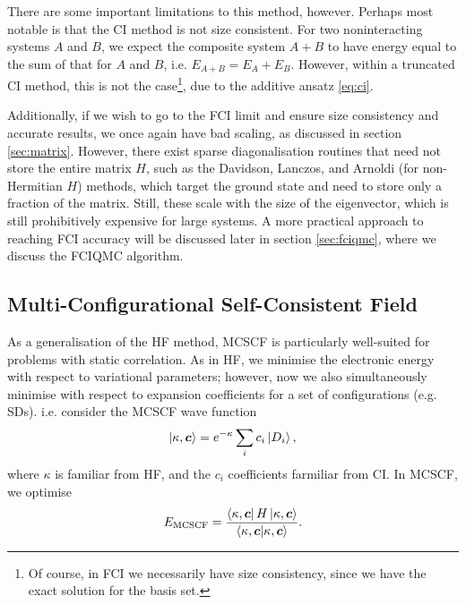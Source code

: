 There are some important limitations to this method, however. Perhaps most notable is that the \gls{CI} method is not size consistent. For two noninteracting systems $A$ and $B$, we expect the composite system $A+B$ to have energy equal to the sum of that for $A$ and $B$, i.e. $E_{A+B}=E_A+E_B$. However, within a truncated \gls{CI} method, this is not the case\footnote{Of course, in \gls{FCI} we necessarily have size consistency, since we have the exact solution for the basis set.}, due to the additive ansatz \ref{eq:ci}.

Additionally, if we wish to go to the \gls{FCI} limit and ensure size consistency and accurate results, we once again have bad scaling, as discussed in section \ref{sec:matrix}. However, there exist sparse diagonalisation routines that need not store the entire matrix $H$, such as the Davidson,\cite{davidsonIterative1975} Lanczos,\cite{lanczosIteration1950} and Arnoldi\cite{arnoldiPrinciple1951} (for non-Hermitian $H$) methods, which target the ground state and need to store only a fraction of the matrix. Still, these scale with the size of the eigenvector, which is still prohibitively expensive for large systems. A more practical approach to reaching \gls{FCI} accuracy will be discussed later in section \ref{sec:fciqmc}, where we discuss the \gls{FCIQMC} algorithm.

\subsection{Multi-Configurational Self-Consistent Field}

As a generalisation of the \gls{HF} method, \gls{MCSCF} is particularly well-suited for problems with static correlation.\cite{helgakerMolecular2014,eadeDirect1981,roosNew1972} As in \gls{HF}, we minimise the electronic energy with respect to variational parameters; however, now we also simultaneously minimise with respect to expansion coefficients for a set of configurations (e.g. \glspl{SD}). i.e. consider the MCSCF wave function
\begin{equation}
\ket{\kappa,\bm c} = e^{-\kappa}\sum_ic_i\ket{D_i},
\end{equation}
where $\kappa$ is familiar from HF, and the $c_i$ coefficients farmiliar from \gls{CI}. In MCSCF, we optimise
\begin{equation}
E_\mathrm{MCSCF} = \frac{\bra{\kappa,\bm c}H\ket{\kappa,\bm c}}{\bra{\kappa,\bm c}\ket{\kappa,\bm c}}.
\end{equation}


